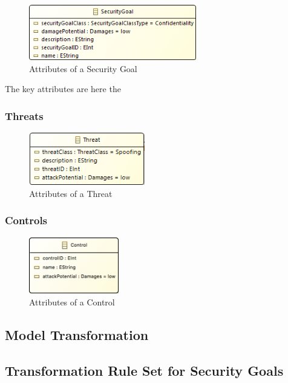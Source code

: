 \begin{figure}[H]
\centering
\includegraphics[width=0.65\textwidth]{pictures/securitygoal.png}
\caption{Attributes of a Security Goal}
\label{fig:security_goal}
\end{figure} 

The key attributes are here the \textit{}

\subsubsection*{Threats}

\begin{figure}[H]
\centering
\includegraphics[width=0.45\textwidth]{pictures/threat.png}
\caption{Attributes of a Threat}
\label{fig:threat}
\end{figure} 

\subsubsection*{Controls}

\begin{figure}[H]
\centering
\includegraphics[width=0.35\textwidth]{pictures/control.png}
\caption{Attributes of a Control}
\label{fig:control}
\end{figure} 

\subsection{Model Transformation}

\subsection{Transformation Rule Set for Security Goals}

